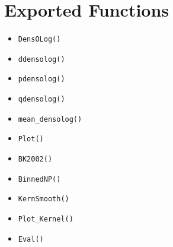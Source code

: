 \documentclass[11pt]{article}
\begin{document}
\section{Exported Functions}

\begin{itemize}
  \item \texttt{DensOLog()}
  \item \texttt{ddensolog()}
  \item \texttt{pdensolog()}
  \item \texttt{qdensolog()}
  \item \texttt{mean\_densolog()}
  \item \texttt{Plot()}
  \item \texttt{BK2002()}
  \item \texttt{BinnedNP()}
  \item \texttt{KernSmooth()}
  \item \texttt{Plot\_Kernel()}
  \item \texttt{Eval()}
\end{itemize}
\end{document}
